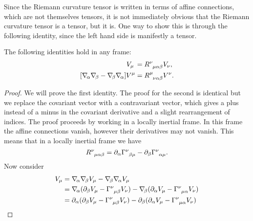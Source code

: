 \documentclass[fleqn]{NotesClass}
\newcommand*{\christoffel}[3]{\tensor{\Gamma}{^{#1}_{{#2}{#3}}}}
\newcommand*{\covariantDerivative}[1]{\nabla_{\!#1}}
\begin{document}
    Since the Riemann curvature tensor is written in terms of affine connections, which are not themselves tensors, it is not immediately obvious that the Riemann curvature tensor is a tensor, but it is.
    One way to show this is through the following identity, since the left hand side is manifestly a tensor.
    \begin{lma}{}{}
        The following identities hold in any frame:
        \begin{align}
            [\covariantDerivative{\alpha}\covariantDerivative{\beta} - \covariantDerivative{\beta}\covariantDerivative{\alpha}] V_{\mu} \mkern3.25mu &= \tensor{R}{^\nu_{\mu\alpha\beta}} V_\nu,\\
            [\covariantDerivative{\alpha}\covariantDerivative{\beta} - \covariantDerivative{\beta}\covariantDerivative{\alpha}] V^\mu &= \tensor{R}{^\mu_{\nu\alpha\beta}}V^\nu.
        \end{align}
        \begin{proof}
            We will prove the first identity.
            The proof for the second is identical but we replace the covariant vector with a contravariant vector, which gives a plus instead of a minus in the covariant derivative and a slight rearrangement of indices.
            The proof proceeds by working in a locally inertial frame.
            In this frame the affine connections vanish, however their derivatives may not vanish.
            This means that in a locally inertial frame we have
            \begin{equation}
                \tensor{R}{^\nu_{\mu\alpha\beta}} = \partial_\alpha \christoffel{\nu}{\beta}{\mu} - \partial_\beta \christoffel{\nu}{\alpha}{\mu}.
            \end{equation}
            Now consider
            \begin{align}
                [\covariantDerivative{\alpha}\covariantDerivative{\beta} - \covariantDerivative{\beta}\covariantDerivative{\alpha}] V_\mu &= \covariantDerivative{\alpha}\covariantDerivative{\beta}V_\mu - \covariantDerivative{\beta}\covariantDerivative{\alpha}V_\mu\\
                &= \covariantDerivative{\alpha}(\partial_\beta V_\mu - \christoffel{\nu}{\mu}{\beta}V_\nu) - \covariantDerivative{\beta}(\partial_\alpha V_\mu- \christoffel{\nu}{\mu}{\alpha}V_\nu)\notag\\
                &= \partial_\alpha(\partial_\beta V_\mu - \christoffel{\nu}{\mu}{\beta}V_\nu) - \partial_\beta(\partial_\alpha V_\mu - \christoffel{\nu}{\mu}{\alpha}V_\nu)\notag\\

\end{align}
\end{proof}
\end{lma}
\end{document}
